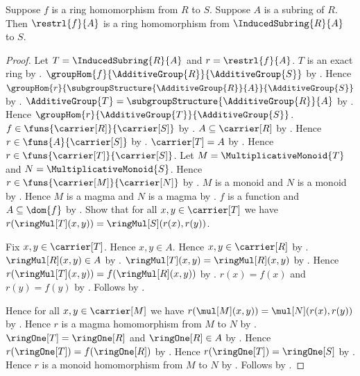 \begin{theorem}\label{ring_hom_domain_restriction}
    Suppose $f$ is a ring homomorphism from $R$ to $S$.
    Suppose $A$ is a subring of $R$.
    Then $\restrl{f}{A}$ is a ring homomorphism from
        $\InducedSubring{R}{A}$ to $S$.
\end{theorem}
\begin{proof}
    Let $T=\InducedSubring{R}{A}$ and $r=\restrl{f}{A}$.
    $T$ is an exact ring by .
    $\groupHom{f}{\AdditiveGroup{R}}{\AdditiveGroup{S}}$ by
        .
    Hence $\groupHom{r}{
        \subgroupStructure{\AdditiveGroup{R}}{A}}{
        \AdditiveGroup{S}}$ by
        .
    $\AdditiveGroup{T}
        =\subgroupStructure{\AdditiveGroup{R}}{A}$ by
        .
    Hence $\groupHom{r}{\AdditiveGroup{T}}{\AdditiveGroup{S}}$.
    $f\in\funs{\carrier[R]}{\carrier[S]}$ by
        .
    $A\subseteq\carrier[R]$ by .
    Hence $r\in\funs{A}{\carrier[S]}$ by .
    $\carrier[T]=A$ by
        .
    Hence $r\in\funs{\carrier[T]}{\carrier[S]}$.
    Let $M=\MultiplicativeMonoid{T}$ and
        $N=\MultiplicativeMonoid{S}$.
    Hence $r\in\funs{\carrier[M]}{\carrier[N]}$ by
        .
    $M$ is a monoid and $N$ is a monoid by
        .
    Hence $M$ is a magma and $N$ is a magma by
        .
    $f$ is a function and $A\subseteq\dom{f}$ by
        .
    Show that for all $x,y\in\carrier[T]$ we have
        $r(\ringMul[T](x,y))=\ringMul[S](r(x),r(y))$.
    \begin{subproof}
        Fix $x,y\in\carrier[T]$.
        Hence $x,y\in A$.
        Hence $x,y\in\carrier[R]$ by
            .
        $\ringMul[R](x,y)\in A$ by .
        $\ringMul[T](x,y)=\ringMul[R](x,y)$ by
            .
        Hence $r(\ringMul[T](x,y))=f(\ringMul[R](x,y))$ by
            .
        $r(x)=f(x)$ and $r(y)=f(y)$ by
            .
        Follows by .
    \end{subproof}
    Hence for all $x,y\in\carrier[M]$ we have
        $r(\mul[M](x,y))=\mul[N](r(x),r(y))$ by
        .
    Hence $r$ is a magma homomorphism from $M$ to $N$ by
        .
    $\ringOne[T]=\ringOne[R]$ and $\ringOne[R]\in A$ by
        .
    Hence $r(\ringOne[T])=f(\ringOne[R])$ by
        .
    Hence $r(\ringOne[T])=\ringOne[S]$ by
        .
    Hence $r$ is a monoid homomorphism from $M$ to $N$ by
        .
    Follows by .
\end{proof}

